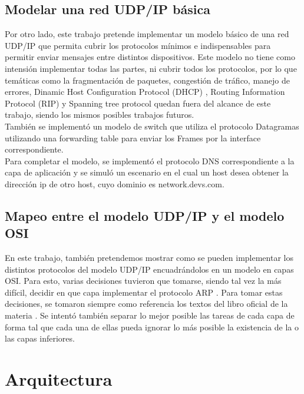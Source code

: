 \documentclass[10pt,a4paper]{article}
\begin{document}
\subsection{Modelar una red UDP/IP básica}

Por otro lado, este trabajo pretende implementar un modelo básico de una red UDP/IP que permita cubrir los protocolos mínimos e indispensables para permitir enviar mensajes entre distintos dispositivos. Este modelo no tiene como intensión implementar todas las partes, ni cubrir todos los protocolos, por lo que temáticas como la fragmentación de paquetes, congestión de tráfico, manejo de errores, Dinamic Host Configuration Protocol (DHCP) \cite[p.~231]{peterson2011computer}, Routing Information Protocol (RIP)\cite[p.~243]{peterson2011computer} y Spanning tree protocol \cite[p.~194]{peterson2011computer} quedan fuera del alcance de este trabajo, siendo los mismos posibles trabajos futuros. \\

También se implementó un modelo de switch que utiliza el protocolo Datagramas \cite[p.~172]{peterson2011computer} utilizando una forwarding table para enviar los Frames por la interface correspondiente. \\

Para completar el modelo, se implementó el protocolo DNS correspondiente a la capa de aplicación y se simuló un escenario en el cual un host desea obtener la dirección ip de otro host, cuyo dominio es network.devs.com.

\subsection{Mapeo entre el modelo UDP/IP y el modelo OSI}

En este trabajo, también pretendemos mostrar como se pueden implementar los distintos protocolos del modelo UDP/IP encuadrándolos en un modelo en capas OSI. Para esto, varias decisiones tuvieron que tomarse, siendo tal vez la más difícil, decidir en que capa implementar el protocolo ARP \cite[p.~228]{peterson2011computer}. Para tomar estas decisiones, se tomaron siempre como referencia los textos del libro oficial de la materia \cite{peterson2011computer}. Se intentó también separar lo mejor posible las tareas de cada capa de forma tal que cada una de ellas pueda ignorar lo más posible la existencia de la o las capas inferiores.

\section{Arquitectura}
\end{document}
